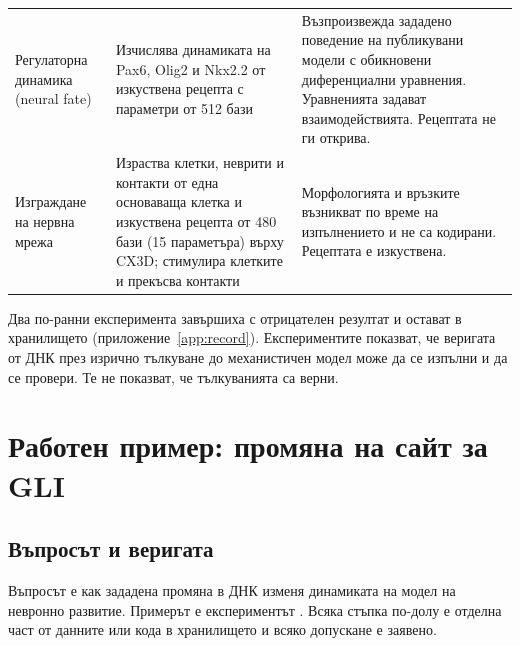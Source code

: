 \documentclass[10.5pt,a4paper]{article}
\begin{document}
\begin{table}[tb]
\begin{tabular}{@{}L{25mm}L{56mm}L{67mm}@{}}
Регулаторна динамика (neural fate) & Изчислява динамиката на Pax6, Olig2 и Nkx2.2 от изкуствена рецепта с параметри от 512 бази & Възпроизвежда зададено поведение на публикувани модели с обикновени диференциални уравнения. Уравненията задават взаимодействията. Рецептата не ги открива. \\
Изграждане на нервна мрежа & Израства клетки, неврити и контакти от една основаваща клетка и изкуствена рецепта от 480 бази (15 параметъра) върху CX3D; стимулира клетките и прекъсва контакти & Морфологията и връзките възникват по време на изпълнението и не са кодирани. Рецептата е изкуствена. \\
\bottomrule
\end{tabular}
\end{table}

Два по-ранни експеримента завършиха с отрицателен резултат и остават в хранилището (приложение~\ref{app:record}). Експериментите показват, че веригата от ДНК през изрично тълкуване до механистичен модел може да се изпълни и да се провери. Те не показват, че тълкуванията са верни.

\section{Работен пример: промяна на сайт за GLI}\label{sec:example}

\subsection{Въпросът и веригата}

Въпросът е как зададена промяна в ДНК изменя динамиката на модел на невронно развитие. Примерът е експериментът . Всяка стъпка по-долу е отделна част от данните или кода в хранилището и всяко допускане е заявено.
\end{document}
